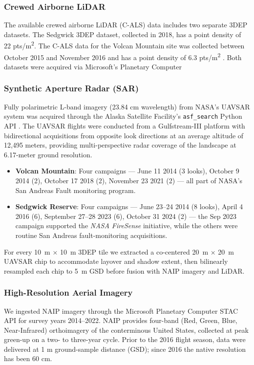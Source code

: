 \documentclass[preprint,12pt,authoryear]{elsarticle}
\begin{document}
\subsubsection{Crewed Airborne LiDAR}
The available crewed airborne LiDAR (C-ALS) data includes two separate 3DEP datasets. The  Sedgwick  3DEP dataset, collected in 2018, has a point density of 22 pts/m\textsuperscript{2}. The C-ALS data for the Volcan Mountain site was collected between October 2015 and November 2016 and has a point density of 6.3 pts/m\textsuperscript{2} \citep{usgs_usgs_2016}. Both datasets were  acquired via Microsoft's Planetary Computer \citep{us_geological_survey_3d_elevation_program_usgs_2023,planetary_computer}

\subsubsection{Synthetic Aperture Radar (SAR)}
Fully polarimetric L-band imagery (23.84 cm wavelength) from NASA’s UAVSAR system was acquired through the Alaska Satellite Facility’s \texttt{asf\_search} Python API \citep{alaska_search}.  The UAVSAR flights were conducted from a Gulfstream-III platform with bidirectional acquisitions from opposite look directions at an average altitude of 12,495 meters, providing multi-perspective radar coverage of the landscape at 6.17-meter ground resolution.

\begin{itemize}[leftmargin=1.5em]
  \item \textbf{Volcan Mountain}: Four campaigns —  June 11 2014 (3 looks), October 9 2014 (2), October 17 2018 (2), November 23 2021 (2) — all part of NASA’s San Andreas Fault monitoring program.
  \item \textbf{Sedgwick Reserve}: Four campaigns — June 23–24 2014 (8 looks), April 4 2016 (6), September 27–28 2023 (6), October 31 2024 (2) — the Sep 2023 campaign supported the \emph{NASA FireSense} initiative, while the others were routine San Andreas fault-monitoring acquisitions.
\end{itemize}


For every \SI{10}{m} × \SI{10}{m} 3DEP tile we extracted a co-centered \SI{20}{m} × \SI{20}{m} UAVSAR chip to accommodate layover and shadow extent, then bilinearly resampled each chip to \SI{5}{m} GSD before fusion with NAIP imagery and LiDAR. 



\subsubsection{High-Resolution Aerial Imagery}
We ingested NAIP imagery through the Microsoft Planetary Computer STAC API \citep{planetary_computer} for survey years 2014–2022.  
NAIP provides four-band (Red, Green, Blue, Near-Infrared) orthoimagery of the conterminous United States, collected at peak green-up on a two- to three-year cycle.  Prior to the 2016 flight season, data were delivered at 1 m ground-sample distance (GSD); since 2016 the native resolution has been 60 cm.
\end{document}
